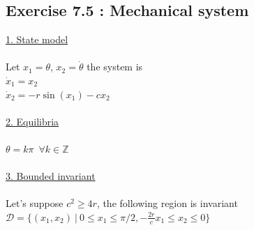 \subsection*{Exercise 7.5 : Mechanical system}
\underline{1. State model} \\ \\
Let $x_1 = \theta $, $x_2 = \dot{\theta }$ the system is \\
\indent$ \dot{x}_1 = x_2$ \\
\indent $\dot{x}_2 = -r\sin (x_1)-cx_2 $ \\ \\
\underline{2. Equilibria} \\ \\
\indent$ \theta = k\pi \ \; \forall k\in \mathbb{Z} $\\ \\
\underline{3. Bounded invariant} \\ \\
Let's suppose $c^2 \geq 4r$, the following region is invariant \\
\indent$\mathcal{D} = \{ (x_1,x_2)\ \vert \ 0\leq x_1\leq \pi /2,-\frac{2r}{c}x_1\leq x_2\leq 0\}$